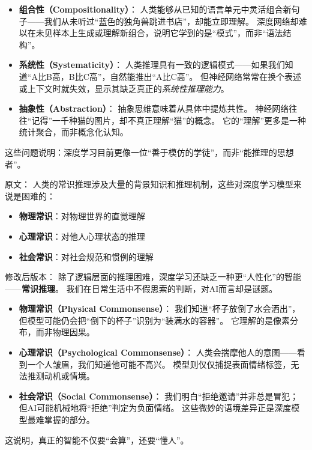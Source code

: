 \begin{itemize}
\item \textbf{组合性（Compositionality）}：  
  人类能够从已知的语言单元中灵活组合新句子——我们从未听过“蓝色的独角兽跳进书店”，却能立即理解。  
  深度网络却难以在未见样本上生成或理解新组合，说明它学到的是“模式”，而非“语法结构”。  

\item \textbf{系统性（Systematicity）}：  
  人类推理具有一致的逻辑模式——如果我们知道“A比B高，B比C高”，自然能推出“A比C高”。  
  但神经网络常常在换个表述或上下文时就失效，显示其缺乏真正的\textit{系统性推理能力}。  

\item \textbf{抽象性（Abstraction）}：  
  抽象思维意味着从具体中提炼共性。  
  神经网络往往“记得”一千种猫的图片，却不真正理解“猫”的概念。  
  它的“理解”更多是一种统计聚合，而非概念化认知。  
\end{itemize}
这些问题说明：深度学习目前更像一位“善于模仿的学徒”，而非“能推理的思想者”。



原文：
人类的常识推理涉及大量的背景知识和推理机制，这些对深度学习模型来说是困难的：
\begin{itemize}
\item \textbf{物理常识}：对物理世界的直觉理解
\item \textbf{心理常识}：对他人心理状态的推理
\item \textbf{社会常识}：对社会规范和惯例的理解
\end{itemize}
修改后版本：
除了逻辑层面的推理困难，深度学习还缺乏一种更“人性化”的智能——\textbf{常识推理}。  
我们在日常生活中不假思索的判断，对AI而言却是谜题。  

\begin{itemize}
\item \textbf{物理常识（Physical Commonsense）}：  
  我们知道“杯子放倒了水会洒出”，但模型可能仍会把“倒下的杯子”识别为“装满水的容器”。  
  它理解的是像素分布，而非物理因果。  

\item \textbf{心理常识（Psychological Commonsense）}：  
  人类会揣摩他人的意图——看到一个人皱眉，我们知道他可能不高兴。  
  模型则仅仅捕捉表面情绪标签，无法推测动机或情境。  

\item \textbf{社会常识（Social Commonsense）}：  
  我们明白“拒绝邀请”并非总是冒犯；  
  但AI可能机械地将“拒绝”判定为负面情绪。  
  这些微妙的语境差异正是深度模型最难掌握的部分。  
\end{itemize}
这说明，真正的智能不仅要“会算”，还要“懂人”。



